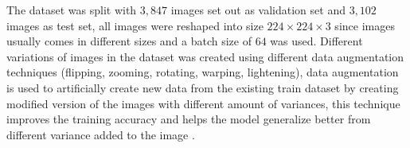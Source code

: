 \documentclass[12pt]{report}
\numberwithin{equation}{section}
\begin{document}
The dataset was split with $3,847$ images set out as validation set and $3,102$ images as test set, all images were reshaped into size $224\times 224\times 3$ since images usually comes in different sizes and a batch size of $64$ was used. Different variations of images in the dataset was created using different data augmentation techniques (flipping, zooming, rotating, warping, lightening), data augmentation is used to artificially create new data from the existing train dataset by creating modified version of the images with different amount of variances, this technique improves the training accuracy and helps the model generalize better from different variance added to the image {\cite{stephen2019efficient}}. 

\end{document}
